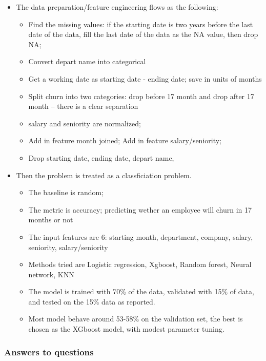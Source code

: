\documentclass[11pt]{article}
\providecommand{\tightlist}{%
      \setlength{\itemsep}{0pt}\setlength{\parskip}{0pt}}
\begin{document}
    \begin{itemize}
\tightlist
\item
  The data preparation/feature engineering flows as the following:

  \begin{itemize}
  \tightlist
  \item
    Find the missing values: if the starting date is two years before
    the last date of the data, fill the last date of the data as the NA
    value, then drop NA;
  \item
    Convert depart name into categorical
  \item
    Get a working date as starting date - ending date; save in units of
    months
  \item
    Split churn into two categories: drop before 17 month and drop after
    17 month -- there is a clear separation
  \item
    salary and seniority are normalized;
  \item
    Add in feature month joined; Add in feature salary/seniority;
  \item
    Drop starting date, ending date, depart name,
  \end{itemize}
\item
  Then the problem is treated as a classficiation problem.

  \begin{itemize}
  \tightlist
  \item
    The baseline is random;
  \item
    The metric is accuracy; predicting wether an employee will churn in
    17 months or not
  \item
    The input features are 6: starting month, department, company,
    salary, seniority, salary/seniority
  \item
    Methods tried are Logistic regression, Xgboost, Random forest,
    Neural network, KNN
  \item
    The model is trained with 70\% of the data, validated with 15\% of
    data, and tested on the 15\% data as reported.
  \item
    Most model behave around 53-58\% on the validation set, the best is
    chosen as the XGboost model, with modest parameter tuning.
  \end{itemize}
\end{itemize}

\hypertarget{answers-to-questions}{%
\subsubsection{Answers to questions}\label{answers-to-questions}}
\end{document}
